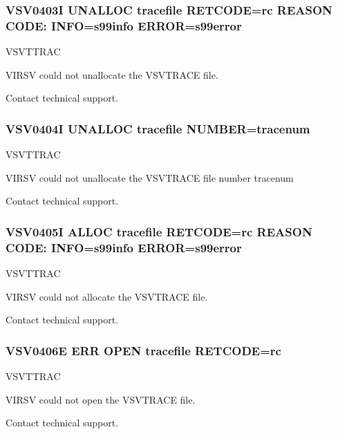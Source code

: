 \documentclass[letterpaper,10pt,english]{sphinxmanual}
\begin{document}
\subsubsection{VSV0403I UNALLOC tracefile RETCODE=rc REASON CODE: INFO=s99info ERROR=s99error}
\label{\detokenize{messages:vsv0403i-unalloc-tracefile-retcode-rc-reason-code-info-s99info-error-s99error}}\begin{description}
\sphinxAtStartPar
VSVTTRAC

\sphinxAtStartPar
VIRSV could not unallocate the VSVTRACE file.

\sphinxAtStartPar
Contact technical support.

\end{description}


\subsubsection{VSV0404I UNALLOC tracefile NUMBER=tracenum}
\label{\detokenize{messages:vsv0404i-unalloc-tracefile-number-tracenum}}\begin{description}
\sphinxAtStartPar
VSVTTRAC

\sphinxAtStartPar
VIRSV could not unallocate the VSVTRACE file number tracenum

\sphinxAtStartPar
Contact technical support.

\end{description}


\subsubsection{VSV0405I ALLOC tracefile RETCODE=rc REASON CODE: INFO=s99info ERROR=s99error}
\label{\detokenize{messages:vsv0405i-alloc-tracefile-retcode-rc-reason-code-info-s99info-error-s99error}}\begin{description}
\sphinxAtStartPar
VSVTTRAC

\sphinxAtStartPar
VIRSV could not allocate the VSVTRACE file.

\sphinxAtStartPar
Contact technical support.

\end{description}


\subsubsection{VSV0406E ERR OPEN tracefile RETCODE=rc}
\label{\detokenize{messages:vsv0406e-err-open-tracefile-retcode-rc}}\begin{description}
\sphinxAtStartPar
VSVTTRAC

\sphinxAtStartPar
VIRSV could not open the VSVTRACE file.

\sphinxAtStartPar
Contact technical support.

\end{description}
\end{document}
